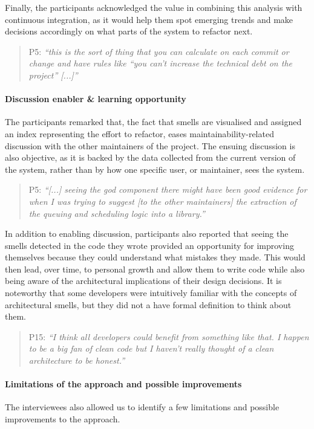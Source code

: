 Finally, the participants acknowledged the value in combining this analysis with continuous integration, as it would help them spot emerging trends and make decisions accordingly on what parts of the system to refactor next.
\begin{quote}
    P5: \emph{``this is the sort of thing that you can calculate on each commit or change and have rules like “you can't increase the technical debt on the project” [...]''}
\end{quote}

\paragraph{Discussion enabler \& learning opportunity}
The participants remarked that, the fact that smells are visualised and assigned an index representing the effort to refactor, eases maintainability-related discussion with the other maintainers of the project.
The ensuing discussion is also objective, as it is backed by the data collected from the current version of the system, rather than by how one specific user, or maintainer, sees the system.

\begin{quote}
    P5: \emph{``[...] seeing the god component there might have been good evidence for when I was trying to suggest [to the other maintainers] the extraction of the queuing and scheduling logic into a library.''}
\end{quote}

In addition to enabling discussion, participants also reported that seeing the smells detected in the code they wrote provided an opportunity for improving themselves because they could understand what mistakes they made.
This would then lead, over time, to personal growth and allow them to write code while also being aware of the architectural implications of their design decisions.
It is noteworthy that some developers were intuitively familiar with the concepts of architectural smells, but they did not a have formal definition to think about them.
\begin{quote}
    P15: \emph{``I think all developers could benefit from something like that. I happen to be a big fan of clean code but I haven't really thought of a clean architecture to be honest.''}
\end{quote}

\paragraph{Limitations of the approach and possible improvements}
The interviewees also allowed us to identify a few limitations and possible improvements to the approach.

